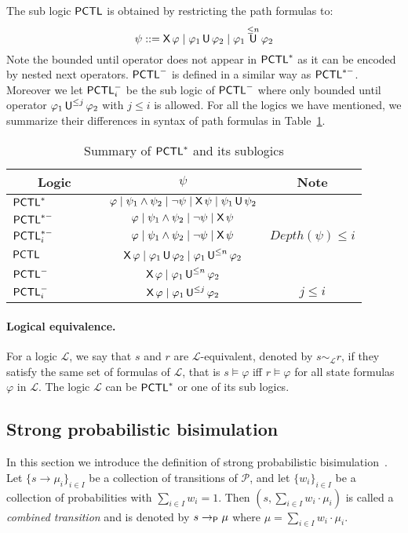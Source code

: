 \documentclass{LMCS}
\def\phi{\varphi}
\DeclareMathOperator{\U}{\text{\sf U}}
\DeclareMathOperator{\X}{\text{\sf X}}
\newcommand{\TRAN}[2]{#1\rightarrow #2}
\newcommand{\TRANP}[2]{#1\rightarrow_{{\sf P}}#2}
\newcommand{\PCTL}{{\sf PCTL}}
\newcommand{\PCTLS}{{\sf PCTL}^{*}}
\newcommand{\MC}[1]{\mathcal{#1}}
\newcommand{\DEPTH}{\mathit{Depth}}
\begin{document}
The sub logic $\PCTL$ is obtained by restricting the path formulas to:
\[\psi::=\X\phi\mid\phi_1\U\phi_2 \mid\phi_1\U^{\le n}\phi_2\]
Note the bounded until operator does not appear in $\PCTL^{*}$ as it
can be encoded by nested next operators.  $\PCTL^{-}$ is defined in a
similar way as $\PCTL^{*-}$.  Moreover we let $\PCTL^{-}_i$ be the
sub logic of $\PCTL^{-}$ where only bounded until operator
$\phi_1\U^{\leq j}\phi_2$ with $j\leq i$ is allowed. For all the logics
we have mentioned, we summarize their
differences in syntax of path formulas in
Table~\ref{tab:logics}.

\begin{table}
\caption{Summary of $\PCTLS$ and its sublogics}\label{tab:logics}
\centering
\begin{tabular}{|l|c|c|}
\hline
$\qquad$Logic$\qquad$ & $\qquad\psi\qquad$ & $\qquad$Note$\qquad$\\[3pt]
\hline
$\PCTL^*$ &  $\phi\mid\psi_1\land\psi_2\mid\neg\psi\mid\X\psi\mid\psi_1\U\psi_2$  &\\[3pt]
\hline
$\PCTL^{*-}$ & $\phi\mid\psi_1\land\psi_2\mid\neg\psi\mid\X\psi$ &\\[3pt]
\hline
$\PCTL^{*-}_i$ &$\phi\mid\psi_1\land\psi_2\mid\neg\psi\mid\X\psi$& $\DEPTH(\psi)\leq i$\\[3pt]
\hline
$\PCTL$ & $\X\phi\mid\phi_1\U\phi_2 \mid\phi_1\U^{\le n}\phi_2$ &\\[3pt]
\hline
$\PCTL^{-}$ & $\X\phi\mid\phi_1\U^{\le n}\phi_2$ & \\[3pt]
\hline
$\PCTL^{-}_i$ & $\X\phi\mid\phi_1\U^{\le j}\phi_2$ & $j\leq i$\\[3pt]
\hline
\end{tabular}
\end{table}



\paragraph{Logical equivalence.}
For a logic $\mathcal{L}$,
we say that $s$ and $r$ are $\mathcal{L}$-equivalent, denoted by $s \sim_{\mathcal{L}} r$,
if they satisfy the same set of formulas of $\mathcal{L}$,
that is $s\models\phi$ iff $r\models\phi$ for all state formulas $\phi$ in $\mathcal{L}$.
The logic $\mathcal{L}$ can be $\PCTL^{*}$ or one of its sub logics.


\subsection{Strong probabilistic bisimulation}\label{sec:strong probabilistic bisimulation}
In this section we introduce the definition of strong probabilistic bisimulation~\cite{SegalaL95}.
Let $\{\TRAN{s}{\mu_i}\}_{i\in I}$ be a collection of
transitions of $\MC{P}$, and let $\{w_i\}_{i\in I}$ be a
collection of probabilities with $\sum_{i\in I}w_i=1$. Then
$(s,\sum_{i\in I}w_i\cdot\mu_i)$ is called a \emph{combined
transition} and is denoted by $\TRANP{s}{\mu}$ where
$\mu=\sum_{i\in I}w_i\cdot\mu_i$.
\end{document}
